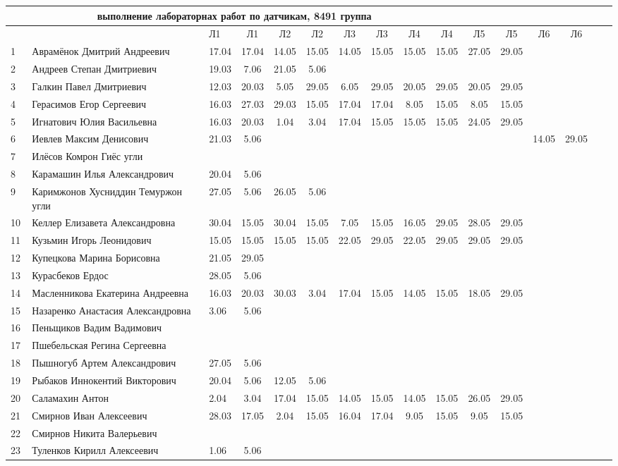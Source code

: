 \newpage
%
\begin{tabular}{l|llccccccccccccc}
\multicolumn{10}{c}{выполнение лабораторнах работ по датчикам, 8491 группа} \\
\toprule
&&Л1&Л1& Л2&Л2& Л3&Л3& Л4&Л4 &Л5&Л5& Л6&Л6\\
\midrule
1\,&   Аврамёнок Дмитрий Андреевич        &17.04&17.04& 14.05 & 15.05& 14.05& 15.05& 15.05& 15.05& 27.05& 29.05\\
2\,&   Андреев Степан Дмитриевич                  &19.03& 7.06& 21.05& 5.06 &&&&\\
3\,&   Галкин Павел Дмитриевич            & 12.03& 20.03& 5.05& 29.05& 6.05& 29.05& 20.05 & 29.05& 20.05& 29.05\\
4\,&   Герасимов Егор Сергеевич           & 16.03& 27.03& 29.03& 15.05& 17.04& 17.04 & 8.05& 15.05 & 8.05& 15.05\\
5\,&   Игнатович Юлия Васильевна          & 16.03& 20.03& 1.04& 3.04& 17.04& 15.05& 15.05& 15.05 & 24.05 & 29.05\\
\midrule
6\,&   Иевлев Максим Денисович            &21.03& 5.06&&&&&&&&&14.05&29.05\\
7\,&   Илёсов Комрон Гиёс угли            &&&&&&&&\\
8\,&   Карамашин Илья Александрович       &20.04& 5.06&&&&&&\\
9\,&   Каримжонов Хусниддин Темуржон угли &27.05& 5.06& 26.05& 5.06&&&&\\
10\,&  Келлер Елизавета Александровна     & 30.04& 15.05 &30.04& 15.05 & 7.05& 15.05&16.05& 29.05& 28.05 & 29.05\\
\midrule
11\,&  Кузьмин Игорь Леонидович           &15.05 & 15.05& 15.05& 15.05& 22.05& 29.05& 22.05& 29.05 & 29.05 & 29.05\\
12\,&  Купецкова Марина Борисовна         &21.05& 29.05& &&&&&\\
13\,&  Курасбеков Ердос                   &28.05& 5.06&&&&&&\\
14\,&  Масленникова Екатерина Андреевна   & 16.03& 20.03&30.03& 3.04& 17.04& 15.05& 14.05& 15.05 & 18.05& 29.05\\
15\,&  Назаренко Анастасия Александровна  & 3.06& 5.06&&&&&&\\
\midrule
16\,&  Пеньщиков Вадим Вадимович          &&&&&&&&\\
17\,&  Пшебельская Регина Сергеевна       &&&&&&&&\\
18\,&  Пышногуб Артем Александрович       &27.05 & 5.06&&&&&&\\
19\,&  Рыбаков Иннокентий Викторович      &20.04& 5.06& 12.05& 5.06&&&&\\
20\,&  Саламахин Антон                    & 2.04& 3.04& 17.04& 15.05& 14.05& 15.05& 14.05& 15.05 & 26.05 & 29.05\\
\midrule
21\,&  Смирнов Иван Алексеевич            &28.03&17.05& 2.04& 15.05 &16.04 & 17.04& 9.05& 15.05 & 9.05& 15.05\\
22\,&  Смирнов Никита Валерьевич          &&&&&&&&\\
23\,&  Туленков Кирилл Алексеевич         &1.06& 5.06&&&&&&\\
\bottomrule
\end{tabular}

